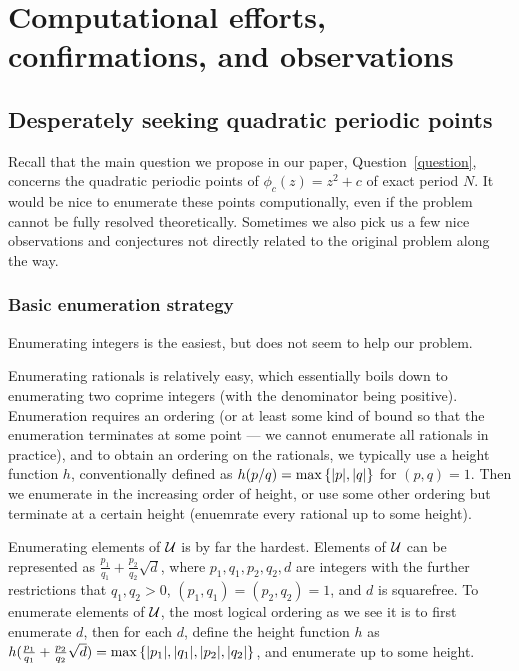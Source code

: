 \section{Computational efforts, confirmations, and observations}
\label{sec:comp}

\subsection{Desperately seeking quadratic periodic points}

Recall that the main question we propose in our paper,
Question~\ref{question}, concerns the quadratic periodic points of
$\phi_c(z) = z^2 + c$ of exact period $N$. It would be nice to
enumerate these points computionally, even if the problem cannot be
fully resolved theoretically. Sometimes we also pick us a few nice
observations and conjectures not directly related to the original
problem along the way.

\subsubsection{Basic enumeration strategy}

Enumerating integers is the easiest, but does not seem to help our
problem.

Enumerating rationals is relatively easy, which essentially boils down
to enumerating two coprime integers (with the denominator being
positive). Enumeration requires an ordering (or at least some kind of
bound so that the enumeration terminates at some point --- we cannot
enumerate all rationals in practice), and to obtain an ordering on the
rationals, we typically use a height function $h$, conventionally
defined as $h(p/q) = \max\left\{|p|, |q|\right\}$ for $(p, q) = 1$. Then we
enumerate in the increasing order of height, or use some other
ordering but terminate at a certain height (enuemrate every rational
up to some height).

Enumerating elements of $\mathcal{U}$ is by far the hardest. Elements of $\mathcal{U}$
can be represented as $\frac{p_1}{q_1} + \frac{p_2}{q_2}\sqrt{d}$,
where $p_1, q_1, p_2, q_2, d$ are integers with the further
restrictions that $q_1, q_2 > 0$, $(p_1, q_1) = (p_2, q_2) = 1$, and
$d$ is squarefree. To enumerate elements of $\mathcal{U}$, the most logical
ordering as we see it is to first enumerate $d$, then for each $d$,
define the height function $h$ as $h(\frac{p_1}{q_1} +
\frac{p_2}{q_2}\sqrt{d}) = \max\left\{|p_1|, |q_1|, |p_2|, |q_2|\right\}$, and
enumerate up to some height.

